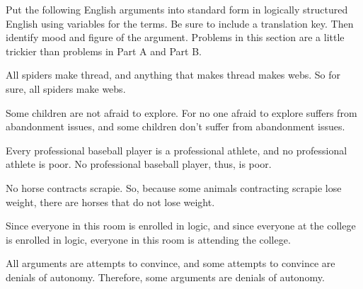 \noindent\problempart Put the following English arguments into standard form in logically structured English using variables for the terms. Be sure to include a translation key. Then identify mood and figure of the argument. Problems in this section are a little trickier than problems in Part A and Part B.


\begin{exercises}
\item  All spiders make thread, and anything that makes thread makes webs.  So for sure, all spiders make webs.

\item  Some children are not afraid to explore. For no one afraid to explore suffers from abandonment issues, and some children don't suffer from abandonment issues.


%


\item  Every professional baseball player is a professional athlete, and no professional athlete is poor. No professional baseball player, thus, is poor.


\item  No horse contracts scrapie. So, because some animals contracting scrapie lose weight, there are horses that do not lose weight.

%



\item  Since everyone in this room is enrolled in logic, and since everyone at the college is enrolled in logic, everyone in this room is attending the college.

\item   All arguments are attempts to convince, and some attempts to convince are denials of autonomy. Therefore, some arguments are denials of autonomy.


\end{exercises}
